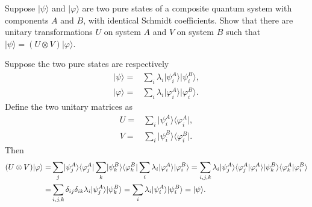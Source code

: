 \documentclass[en]{sol-man}
\begin{document}
\begin{exe}
    Suppose $\lvert\psi\rangle$ and $\lvert\varphi\rangle$ are two pure states of a composite quantum system with components $A$ and $B$, with identical Schmidt coefficients. Show that there are unitary transformations $U$ on system $A$ and $V$ on system $B$ such that $\lvert\psi\rangle=(U\otimes V)\lvert\varphi\rangle$.
\end{exe}
\begin{pf}
    Suppose the two pure states are respectively
    \begin{align}
        \lvert\psi\rangle=&\sum_i\lambda_i\lvert\psi_i^A\rangle\lvert\psi_i^B\rangle,\\
        \lvert\varphi\rangle=&\sum_i\lambda_i\lvert\varphi_i^A\rangle\lvert\varphi_i^B\rangle.
    \end{align}
    Define the two unitary matrices as
    \begin{align}
        U=&\sum_i\lvert\psi_i^A\rangle\langle\varphi_i^A\rvert,\\
        V=&\sum_i\lvert\psi_i^B\rangle\langle\varphi_i^B\rvert.
    \end{align}
    Then
    \begin{align}
        \notag(U\otimes V)\lvert\varphi\rangle=&\sum_j\lvert\psi_j^A\rangle\langle\varphi_j^A\rvert\sum_k\lvert\psi_k^B\rangle\langle\varphi_k^B\rvert\sum_i\lambda_i\lvert\varphi_i^A\rangle\lvert\varphi_i^B\rangle=\sum_{i,j,k}\lambda_i\lvert\psi_j^A\rangle\langle\varphi_j^A\vert\varphi_i^A\rangle\lvert\psi_k^B\rangle\langle\varphi_k^A\vert\varphi_i^B\rangle\\
        =&\sum_{i,j,k}\delta_{ij}\delta_{ik}\lambda_i\lvert\psi_j^A\rangle\lvert\psi_k^B\rangle=\sum_i\lambda_i\lvert\psi_i^A\rangle\lvert\psi_i^B\rangle=\lvert\psi\rangle.
    \end{align}
\end{pf}
\end{document}
